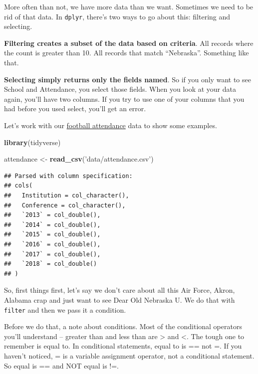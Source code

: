 \documentclass[]{book}
\newenvironment{Shaded}{\begin{snugshade}}{\end{snugshade}}
\newcommand{\KeywordTok}[1]{\textcolor[rgb]{0.13,0.29,0.53}{\textbf{#1}}}
\newcommand{\NormalTok}[1]{#1}
\newcommand{\StringTok}[1]{\textcolor[rgb]{0.31,0.60,0.02}{#1}}
\begin{document}
More often than not, we have more data than we want. Sometimes we need to be rid of that data. In \texttt{dplyr}, there's two ways to go about this: filtering and selecting.

\textbf{Filtering creates a subset of the data based on criteria}. All records where the count is greater than 10. All records that match ``Nebraska''. Something like that.

\textbf{Selecting simply returns only the fields named}. So if you only want to see School and Attendance, you select those fields. When you look at your data again, you'll have two columns. If you try to use one of your columns that you had before you used select, you'll get an error.

Let's work with our \href{https://unl.box.com/s/etqna5bfvf3b0gsnw0kcjjn1rxx9335s}{football attendance} data to show some examples.

\begin{Shaded}
\begin{Highlighting}[]
\KeywordTok{library}\NormalTok{(tidyverse)}
\end{Highlighting}
\end{Shaded}

\begin{Shaded}
\begin{Highlighting}[]
\NormalTok{attendance <-}\StringTok{ }\KeywordTok{read_csv}\NormalTok{(}\StringTok{'data/attendance.csv'}\NormalTok{)}
\end{Highlighting}
\end{Shaded}

\begin{verbatim}
## Parsed with column specification:
## cols(
##   Institution = col_character(),
##   Conference = col_character(),
##   `2013` = col_double(),
##   `2014` = col_double(),
##   `2015` = col_double(),
##   `2016` = col_double(),
##   `2017` = col_double(),
##   `2018` = col_double()
## )
\end{verbatim}

So, first things first, let's say we don't care about all this Air Force, Akron, Alabama crap and just want to see Dear Old Nebraska U. We do that with \texttt{filter} and then we pass it a condition.

Before we do that, a note about conditions. Most of the conditional operators you'll understand -- greater than and less than are \textgreater{} and \textless{}. The tough one to remember is equal to. In conditional statements, equal to is == not =. If you haven't noticed, = is a variable assignment operator, not a conditional statement. So equal is == and NOT equal is !=.
\end{document}
